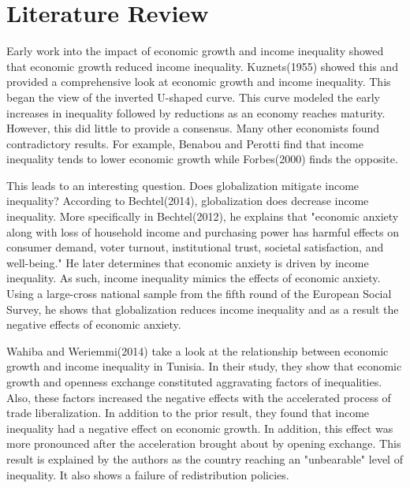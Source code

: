\documentclass{article}
\begin{document}
\section{Literature Review}
\vspace{2mm}

\quad Early work into the impact of economic growth and income inequality showed that economic growth reduced income inequality.  Kuznets(1955) showed this and provided a comprehensive look at economic growth and income inequality.  This began the view of the inverted U-shaped curve.  This curve modeled the early increases in inequality followed by reductions as an economy reaches maturity.  However, this did little to provide a consensus.  Many other economists found contradictory results.  For example, Benabou and Perotti find that income inequality tends to lower economic growth while Forbes(2000) finds the opposite.
\vspace{2mm}

\quad This leads to an interesting question.  Does globalization mitigate income inequality?  According to Bechtel(2014), globalization does decrease income inequality.  More specifically in Bechtel(2012), he explains that "economic anxiety along with loss of household income and purchasing power has harmful effects on consumer demand, voter turnout, institutional trust, societal satisfaction, and well-being."  He later determines that economic anxiety is driven by income inequality.  As such, income inequality mimics the effects of economic anxiety.  Using a large-cross national sample from the fifth round of the European Social Survey, he shows that globalization reduces income inequality and as a result the negative effects of economic anxiety.
\vspace{2mm}

\quad Wahiba and Weriemmi(2014) take a look at the relationship between economic growth and income inequality in Tunisia.  In their study, they show that economic growth and openness exchange constituted aggravating factors of inequalities.  Also, these factors increased the negative  effects with the accelerated process of trade liberalization.  In addition to the prior result, they found that income inequality had a negative effect on economic growth.  In addition, this effect was more pronounced after the acceleration brought about by opening exchange.  This result is explained by the authors as the country reaching an "unbearable" level of inequality.  It also shows a failure of redistribution policies.  
\vspace{2mm}
\end{document}
